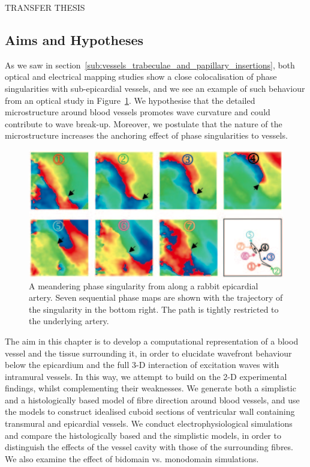 TRANSFER THESIS

\subsection{Aims and Hypotheses} %
\label{sec:aims}
  As we saw in section~\ref{sub:vessels_trabeculae_and_papillary_insertions}, both optical and electrical mapping studies show a close colocalisation of phase singularities with sub-epicardial vessels, and we see an example of such behaviour from an optical study in Figure~\ref{fig:meandering}. We hypothesise that the detailed microstructure around blood vessels promotes wave curvature and could contribute to wave break-up. Moreover, we postulate that the nature of the microstructure increases the anchoring effect of phase singularities to vessels.

  \begin{figure}[htbp]
		\centering
		\includegraphics[width=1\textwidth]{Ch5/Figs/valderrabano}
    \caption{A meandering phase singularity from \cite{Valderrabano2003} along a rabbit epicardial artery. Seven sequential phase maps are shown with the trajectory of the  singularity in the bottom right. The path is tightly restricted to the underlying artery.}
		\label{fig:meandering}
	\end{figure}

	The aim in this chapter is to develop a computational representation of a blood vessel and the tissue surrounding it, in order to elucidate wavefront behaviour below the epicardium and the full 3-D interaction of excitation waves with intramural vessels. In this way, we attempt to build on the 2-D experimental findings, whilst complementing their weaknesses. We generate both a simplistic and a histologically based model of fibre direction around blood vessels, and use the models to construct idealised cuboid sections of ventricular wall containing transmural and epicardial vessels. We conduct electrophysiological simulations and compare the histologically based and the  simplistic models, in order to distinguish the effects of the vessel cavity with those of the surrounding fibres. We also examine the effect of bidomain vs. monodomain simulations.

